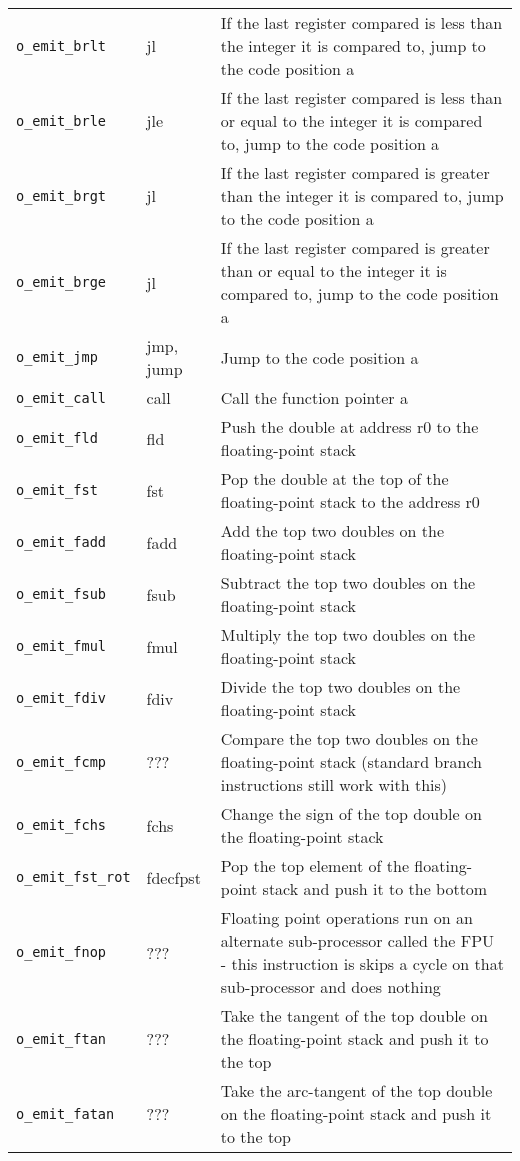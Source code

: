 \documentclass[10pt,a4paper]{article}
\begin{document}
{\begin{tabular}{l l p{10cm}}
\verb|o_emit_brlt| & jl & If the last register compared is less than the integer it is compared to, jump to the code position a \\
\verb|o_emit_brle| & jle & If the last register compared is less than or equal to the integer it is compared to, jump to the code position a \\
\verb|o_emit_brgt| & jl & If the last register compared is greater than the integer it is compared to, jump to the code position a \\
\verb|o_emit_brge| & jl & If the last register compared is greater than or equal to the integer it is compared to, jump to the code position a \\
\verb|o_emit_jmp| & jmp, jump & Jump to the code position a \\
\verb|o_emit_call| & call & Call the function pointer a \\
\verb|o_emit_fld| & fld & Push the double at address r0 to the floating-point stack \\
\verb|o_emit_fst| & fst & Pop the double at the top of the floating-point stack to the address r0 \\
\verb|o_emit_fadd| & fadd & Add the top two doubles on the floating-point stack \\
\verb|o_emit_fsub| & fsub & Subtract the top two doubles on the floating-point stack \\
\verb|o_emit_fmul| & fmul & Multiply the top two doubles on the floating-point stack \\
\verb|o_emit_fdiv| & fdiv & Divide the top two doubles on the floating-point stack \\
\verb|o_emit_fcmp| & ??? & Compare the top two doubles on the floating-point stack (standard branch instructions still work with this) \\
\verb|o_emit_fchs| & fchs & Change the sign of the top double on the floating-point stack \\
\verb|o_emit_fst_rot| & fdecfpst & Pop the top element of the floating-point stack and push it to the bottom \\
\verb|o_emit_fnop| & ??? & Floating point operations run on an alternate sub-processor called the FPU - this instruction is skips a cycle on that sub-processor and does nothing \\
\verb|o_emit_ftan| & ??? & Take the tangent of the top double on the floating-point stack and push it to the top \\
\verb|o_emit_fatan| & ??? & Take the arc-tangent of the top double on the floating-point stack and push it to the top \\

\end{tabular}}
\end{document}
